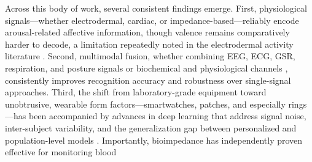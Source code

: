 Across this body of work, several consistent findings emerge. First, physiological signals---whether electrodermal, cardiac, or impedance-based---reliably encode arousal-related affective information, though valence remains comparatively harder to decode, a limitation repeatedly noted in the electrodermal activity literature \cite{damelio2023exploring,damelio2025emotion}. Second, multimodal fusion, whether combining EEG, ECG, GSR, respiration, and posture signals \cite{liu2018human,song2019mped,zou2024emotion,cimtay2020cross} or biochemical and physiological channels \cite{gutierrezmartin2022fear,qu2024advancing}, consistently improves recognition accuracy and robustness over single-signal approaches. Third, the shift from laboratory-grade equipment toward unobtrusive, wearable form factors---smartwatches, patches, and especially rings---has been accompanied by advances in deep learning that address signal noise, inter-subject variability, and the generalization gap between personalized and population-level models \cite{dissanayake2022sigrep,li2024comparison,saganowski2022emotion}. Importantly, bioimpedance has independently proven effective for monitoring blood




